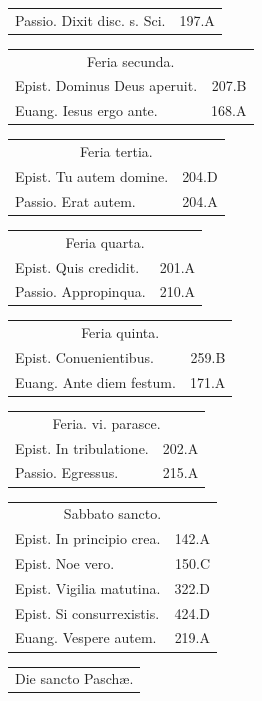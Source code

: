 \documentclass[a5paper,10pt]{book}
\def\ae{æ}
\begin{document}
\begin{multicols}{2}
\begin{tabular}{l r}
Passio. Dixit disc. s. Sci. & 197.A\\
\end{tabular}
\begin{tabular}{l r}
\multicolumn{2}{c}{\color{red} Feria secunda.}\\
Epist. Dominus Deus aperuit. & 207.B\\
Euang. Iesus ergo ante. & 168.A\\
\end{tabular}
\begin{tabular}{l r}
\multicolumn{2}{c}{\color{red} Feria tertia.}\\
Epist. Tu autem domine. & 204.D\\
Passio. Erat autem. & 204.A\\
\end{tabular}
\begin{tabular}{l r}
\multicolumn{2}{c}{\color{red} Feria quarta.}\\
Epist. Quis credidit. & 201.A\\
Passio. Appropinqua. & 210.A\\
\end{tabular}
\begin{tabular}{l r}
\multicolumn{2}{c}{\color{red} Feria quinta.}\\
Epist. Conuenientibus. & 259.B\\
Euang. Ante diem festum. & 171.A\\
\end{tabular}
\begin{tabular}{l r}
\multicolumn{2}{c}{\color{red} Feria. vi. parasce.}\\
Epist. In tribulatione. & 202.A\\
Passio. Egressus. & 215.A\\
\end{tabular}
\begin{tabular}{l r}
\multicolumn{2}{c}{\color{red} Sabbato sancto.}\\
Epist. In principio crea. & 142.A\\
Epist. Noe vero. & 150.C\\
\color{red} Epist. Vigilia matutina. & 322.D\\
Epist. Si consurrexistis. & 424.D\\
Euang. Vespere autem. & 219.A\\
\end{tabular}
\begin{tabular}{l r}
\multicolumn{2}{c}{\color{red} Die sancto Pasch\ae .}\\

\end{tabular}
\end{multicols}
\end{document}

